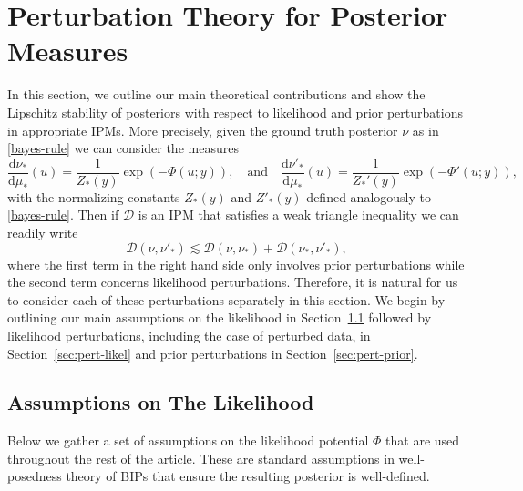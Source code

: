 \documentclass[final]{siamart171218}
\newcommand{\dd}{\text{d}}
\newcommand{\K}{\mathcal{D}}
\begin{document}
\section{Perturbation Theory for Posterior Measures}\label{sec:pert-theory-post}

In this section, we outline our main  theoretical contributions and show the 
Lipschitz stability of posteriors with respect to likelihood and prior perturbations in appropriate 
IPMs. More precisely, given the ground truth posterior $\nu$ as in \eqref{bayes-rule}
we can consider the measures
\begin{equation*}
    \frac{\dd \nu_\ast}{\dd \mu_\ast}(u) = \frac{1}{Z_\ast(y)} \exp \left( - \Phi(u; y) \right), 
    \quad \text{and} \quad 
    \frac{\dd \nu'_\ast}{\dd \mu_\ast}(u) = \frac{1}{Z_\ast'(y)} \exp \left( - \Phi'(u; y) \right), 
\end{equation*}
with the normalizing constants $Z_\ast(y)$ and $Z'_\ast(y)$ defined analogously to \eqref{bayes-rule}. Then if $\K$ is an IPM 
that satisfies a weak triangle inequality we can readily write 
\begin{equation*}
    \K( \nu, \nu'_\ast) \lesssim \K(\nu, \nu_\ast) + \K(\nu_\ast, \nu'_\ast),
\end{equation*} 
where the first term in the right hand side only involves prior perturbations while 
the second term concerns likelihood perturbations. Therefore, it is natural for us 
to consider each of these perturbations separately in this section.
We begin by outlining our main assumptions on the likelihood in Section~\ref{sec:likelihood-assumptions} followed by 
likelihood perturbations, including the case of perturbed data, in
Section~\ref{sec:pert-likel} and prior perturbations  in Section~\ref{sec:pert-prior}.


\subsection{Assumptions on The Likelihood}\label{sec:likelihood-assumptions}

Below we gather a set of assumptions on the likelihood potential $\Phi$ that are used throughout the rest of the
article. 
These are standard assumptions in
well-posedness theory of BIPs \cite{hosseini-convex,hosseini-sparse,latz,sprungk,stuart-acta-numerica, sullivan} that 
ensure the resulting posterior is well-defined. 
\end{document}
